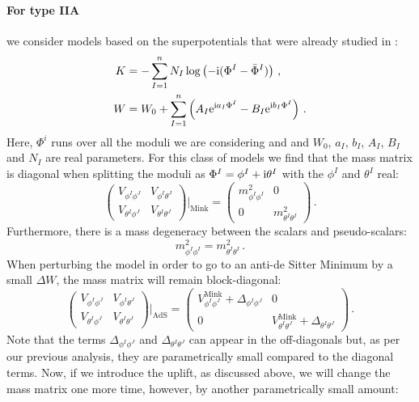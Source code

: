 \documentclass[12pt]{report}
\newcommand{\be}{\begin{equation}}
\newcommand{\ee}{\end{equation}}
\newcommand{\bea}{\begin{equation}\begin{aligned}}
\newcommand{\eea}{\end{aligned}\end{equation}}
\def\rmi{{\rm i}}
\def\rme{{\rm e}}
\begin{document}
\paragraph{For type IIA} we consider models based on the superpotentials that were already studied in \cite{Kallosh:2019zgd}:
\bea 
K &= - \sum_{I=1}^n N_I \log \left( -\rmi (\Phi^I - \bar{\Phi}^I )\right)\,,\\
W &= W_0 + \sum_{I=1}^n \left( A_I \rme^{\rmi a_I \Phi^I} - B_I \rme^{\rmi b_I \Phi^I} \right)\,.
\label{eq:IIAKW}
\eea 
Here, $\Phi^i$ runs over all the moduli we are considering and and $W_0$, $a_I$, $b_I$, $A_I$, $B_I$ and $N_I$ are real parameters. For this class of models we find that the mass matrix is diagonal when splitting the moduli as $\Phi^I = \phi^I + \rmi \theta^I$ with the $\phi^I$ and $\theta^I$ real:
\be 
\begin{pmatrix}
V_{\phi^I\phi^J} & V_{\phi^I \theta^J}\\
V_{\theta^I\phi^J} & V_{\theta^I \theta^J}
\end{pmatrix}\Bigg|_{\text{Mink}}
=
\begin{pmatrix}
m^2_{\phi^I\phi^I} & 0\\
0 & m^2_{\theta^I \theta^I}
\end{pmatrix}\,.
\ee
Furthermore, there is a mass degeneracy between the scalars and pseudo-scalars:
\be 
m^2_{\phi^I\phi^I} = m^2_{\theta^I \theta^I}\,.
\ee
When perturbing the model in order to go to an anti-de Sitter Minimum by a small $\Delta W$, the mass matrix will remain block-diagonal:
\be 
\begin{pmatrix}
V_{\phi^I\phi^J} & V_{\phi^I \theta^J}\\
V_{\theta^I\phi^J} & V_{\theta^I \theta^J}
\end{pmatrix}\Bigg|_{\text{AdS}}
=
\begin{pmatrix}
V^{\text{Mink}}_{\phi^I\phi^J} + \Delta_{\phi^I \phi^J}& 0\\
0 & V^{\text{Mink}}_{\theta^I \theta^J}+\Delta_{\theta^I \theta^J}
\end{pmatrix}\,.
\ee
Note that the terms $\Delta_{\phi^I \phi^J}$ and $\Delta_{\theta^I \theta^J}$ can appear in the off-diagonals but, as per our previous analysis, they are parametrically small compared to the diagonal terms. Now, if we introduce the uplift, as discussed above, we will change the mass matrix one more time, however, by another parametrically small amount:
\end{document}
